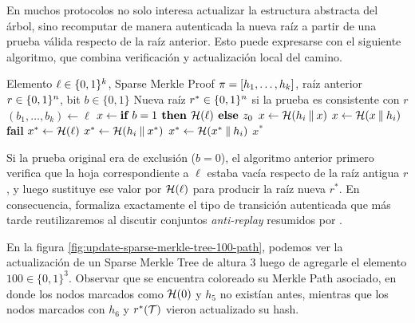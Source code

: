 En muchos protocolos no solo interesa actualizar la estructura abstracta del árbol, sino recomputar de manera autenticada la nueva raíz a partir de una prueba válida respecto de la raíz anterior. Esto puede expresarse con el siguiente algoritmo, que combina verificación y actualización local del camino.

\begin{algorithm}[ht]
	\caption{Actualización autenticada de la raíz de un Sparse Merkle Tree}
	\label{alg:update-smt-root-from-proof}
	\begin{algorithmic}[1]
		\Require Elemento $\ell \in \{0,1\}^{k}$, Sparse Merkle Proof $\pi = [h_1, \ldots, h_k]$, raíz anterior $r \in \{0,1\}^{n}$, bit $b \in \{0,1\}$
		\Ensure Nueva raíz $r^* \in \{0,1\}^{n}$ si la prueba es consistente con $r$
		\State $(b_1, \ldots, b_k) \gets \ell$ 
		\State $x \gets \textbf{if } b = 1 \textbf{ then } \mathcal{H}(\ell) \textbf{ else } z_{0}$
				\State $x \gets \mathcal{H}(h_i \mathbin{\|} x)$
			\Else
				\State $x \gets \mathcal{H}(x \mathbin{\|} h_i)$
			\EndIf
		\EndFor
			\State \Return \textbf{fail}
		\EndIf
		\State $x^* \gets \mathcal{H}(\ell)$
				\State $x^* \gets \mathcal{H}(h_i \mathbin{\|} x^*)$
			\Else
				\State $x^* \gets \mathcal{H}(x^* \mathbin{\|} h_i)$
			\EndIf
		\EndFor
		\State \Return $x^*$
	\end{algorithmic}
\end{algorithm}

Si la prueba original era de exclusión ($b = 0$), el algoritmo anterior primero verifica que la hoja correspondiente a $\ell$ estaba vacía respecto de la raíz antigua $r$, y luego sustituye ese valor por $\mathcal{H}(\ell)$ para producir la raíz nueva $r^*$. En consecuencia, formaliza exactamente el tipo de transición autenticada que más tarde reutilizaremos al discutir conjuntos \textit{anti-replay} resumidos por \SMT.

En la figura \ref{fig:update-sparse-merkle-tree-100-path}, podemos ver la actualización de un Sparse Merkle Tree de altura $3$ luego de agregarle el elemento $100 \in \{0,1\}^3$. Observar que se encuentra coloreado su Merkle Path asociado, en donde los nodos marcados como $\mathcal{H}(0)$ y $h_5$ no existían antes, mientras que los nodos marcados con $h_6$ y $r^*(\mathcal{T})$ vieron actualizado su hash.

